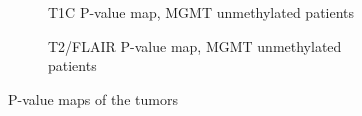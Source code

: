 \begin{subappendices}
\begin{figure}[H]
        \begin{subfigure}[t]{0.4\textwidth}
            \centering
            \caption{\gls{T1C} P-value map, \gls{MGMT} unmethylated patients}\label{fig:HGG_loc_T1_p_value_map_unmethylated}
        \end{subfigure}
        \begin{subfigure}[t]{0.4\textwidth}
            \centering
            \caption{\gls{T2}/\gls{FLAIR} P-value map, \gls{MGMT} unmethylated patients}\label{fig:HGG_loc_T2_p_value_map_unmethylated}
        \end{subfigure}
        \caption{P-value maps of the tumors}
    \end{figure}
\end{subappendices}




